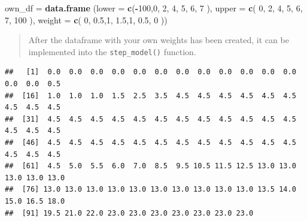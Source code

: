 \documentclass[
]{book}
\newenvironment{Shaded}{\begin{snugshade}}{\end{snugshade}}
\newcommand{\CommentTok}[1]{\textcolor[rgb]{0.56,0.35,0.01}{\textit{#1}}}
\newcommand{\ControlFlowTok}[1]{\textcolor[rgb]{0.13,0.29,0.53}{\textbf{#1}}}
\newcommand{\DataTypeTok}[1]{\textcolor[rgb]{0.13,0.29,0.53}{#1}}
\newcommand{\DecValTok}[1]{\textcolor[rgb]{0.00,0.00,0.81}{#1}}
\newcommand{\FloatTok}[1]{\textcolor[rgb]{0.00,0.00,0.81}{#1}}
\newcommand{\KeywordTok}[1]{\textcolor[rgb]{0.13,0.29,0.53}{\textbf{#1}}}
\newcommand{\NormalTok}[1]{#1}
\newcommand{\OperatorTok}[1]{\textcolor[rgb]{0.81,0.36,0.00}{\textbf{#1}}}
\newcommand{\StringTok}[1]{\textcolor[rgb]{0.31,0.60,0.02}{#1}}
\begin{document}
\begin{Shaded}
\begin{Highlighting}[]
\NormalTok{own_df =}\StringTok{ }\KeywordTok{data.frame}\NormalTok{ (}\DataTypeTok{lower  =} \KeywordTok{c}\NormalTok{(}\OperatorTok{-}\DecValTok{100}\NormalTok{,}\DecValTok{0}\NormalTok{,  }\DecValTok{2}\NormalTok{, }\DecValTok{4}\NormalTok{,  }\DecValTok{5}\NormalTok{, }\DecValTok{6}\NormalTok{,   }\DecValTok{7}\NormalTok{    ),}
                     \DataTypeTok{upper  =} \KeywordTok{c}\NormalTok{(  }\DecValTok{0}\NormalTok{, }\DecValTok{2}\NormalTok{,  }\DecValTok{4}\NormalTok{, }\DecValTok{5}\NormalTok{,  }\DecValTok{6}\NormalTok{, }\DecValTok{7}\NormalTok{,   }\DecValTok{100}\NormalTok{  ),}
                     \DataTypeTok{weight =} \KeywordTok{c}\NormalTok{(  }\DecValTok{0}\NormalTok{, }\FloatTok{0.5}\NormalTok{,}\DecValTok{1}\NormalTok{, }\FloatTok{1.5}\NormalTok{,}\DecValTok{1}\NormalTok{, }\FloatTok{0.5}\NormalTok{, }\DecValTok{0}\NormalTok{    ))}
\end{Highlighting}
\end{Shaded}

\begin{quote}
After the dataframe with your own weights has been created, it can be implemented into the \texttt{step\_model()} function.
\end{quote}

\begin{Shaded}
\end{Shaded}

\begin{verbatim}
##   [1]  0.0  0.0  0.0  0.0  0.0  0.0  0.0  0.0  0.0  0.0  0.0  0.0  0.0  0.0  0.5
##  [16]  1.0  1.0  1.0  1.5  2.5  3.5  4.5  4.5  4.5  4.5  4.5  4.5  4.5  4.5  4.5
##  [31]  4.5  4.5  4.5  4.5  4.5  4.5  4.5  4.5  4.5  4.5  4.5  4.5  4.5  4.5  4.5
##  [46]  4.5  4.5  4.5  4.5  4.5  4.5  4.5  4.5  4.5  4.5  4.5  4.5  4.5  4.5  4.5
##  [61]  4.5  5.0  5.5  6.0  7.0  8.5  9.5 10.5 11.5 12.5 13.0 13.0 13.0 13.0 13.0
##  [76] 13.0 13.0 13.0 13.0 13.0 13.0 13.0 13.0 13.0 13.0 13.5 14.0 15.0 16.5 18.0
##  [91] 19.5 21.0 22.0 23.0 23.0 23.0 23.0 23.0 23.0 23.0
\end{verbatim}
\end{document}
